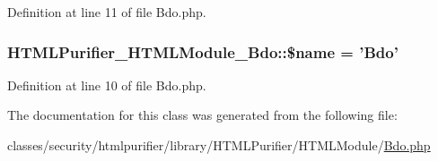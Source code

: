 Definition at line 11 of file Bdo.\+php.

\hypertarget{classHTMLPurifier__HTMLModule__Bdo_ae63a3f1dac1f77d32b44946493fb4813}{
\subsubsection[{\$name}]{\setlength{\rightskip}{0pt plus 5cm}H\+T\+M\+L\+Purifier\+\_\+\+H\+T\+M\+L\+Module\+\_\+\+Bdo\+::\$name = 'Bdo'}}\label{classHTMLPurifier__HTMLModule__Bdo_ae63a3f1dac1f77d32b44946493fb4813}


Definition at line 10 of file Bdo.\+php.



The documentation for this class was generated from the following file\+:\begin{DoxyCompactItemize}
\item 
classes/security/htmlpurifier/library/\+H\+T\+M\+L\+Purifier/\+H\+T\+M\+L\+Module/\hyperlink{Bdo_8php}{Bdo.\+php}\end{DoxyCompactItemize}
